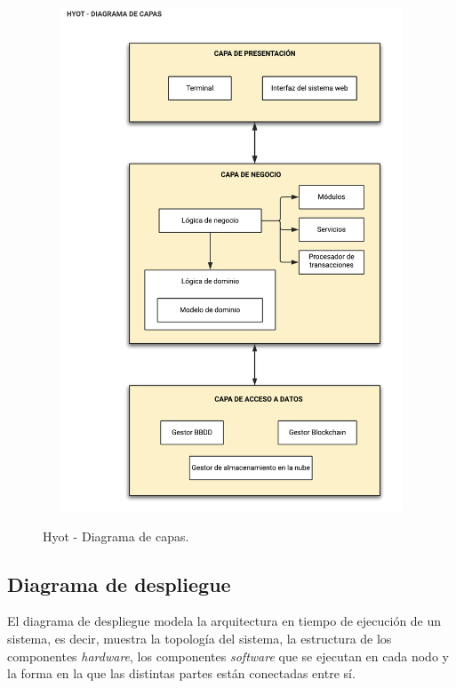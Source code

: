 \documentclass[12pt,a4paper, twoside]{report}
\begin{document}
	\begin{figure}[!ht]   
		\caption{Hyot - Diagrama de capas.} 
		\begin{center} 
			\includegraphics[width=12cm,height=15cm]{Images/design/d_layers} \\
			\label{fig:design_layers} 
		\end{center}  
	\end{figure}	
	
	\subsection{Diagrama de despliegue} \label{d_deployment} %
	
	El diagrama de despliegue modela la arquitectura en tiempo de ejecución de un sistema, es decir, muestra la topología del sistema, la estructura de los componentes \textit{hardware}, los componentes \textit{software} que se ejecutan en cada nodo y la forma en la que las distintas partes están conectadas entre sí. \\
 		
\end{document}
